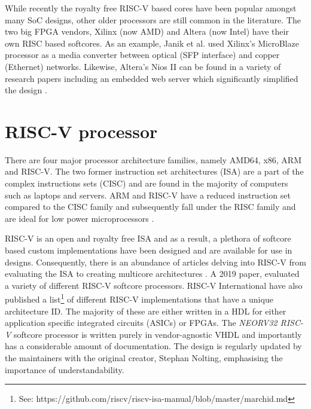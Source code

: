 While recently the royalty free RISC-V based cores have been popular amongst many SoC designs, other older processors are still common in the literature. The two big FPGA vendors, Xilinx (now AMD) and Altera (now Intel) have their own RISC based softcores. As an example, Janik et al. \cite{LwIPMicroblaze} used Xilinx's MicroBlaze processor as a media converter between optical (SFP interface) and copper (Ethernet) networks. Likewise, Altera's Nios II can be found in a variety of research papers including an embedded web server which significantly simplified the design \cite{NiosIIWebserver}. 

 







\section{RISC-V processor}
There are four major processor architecture families, namely AMD64, x86, ARM and RISC-V. The two former instruction set architectures (ISA) 
are a part of the complex instructions sets (CISC) and are found in the majority of computers such as laptops and servers. ARM and RISC-V have a reduced instruction set compared to the CISC family and subsequently fall under the RISC family and are ideal for low power microprocessors \cite{RV16Embedded}.

RISC-V is an open and royalty free ISA and as a result, a plethora of softcore based custom implementations have been designed and are available for use in designs\cite{CatalogRISCSoftcore}. 
Consequently, there is an abundance of articles delving into RISC-V from evaluating the ISA \cite{InvestigatingRiscv} to creating multicore architectures
\cite{RiscVMulticore}. A 2019 paper, \cite{CatalogRISCSoftcore} evaluated a variety of different RISC-V softcore processors. RISC-V International have 
also published a list\footnote[1]{See: https://github.com/riscv/riscv-isa-manual/blob/master/marchid.md} of different RISC-V implementations 
that have a unique architecture ID. The majority of these are either written in a HDL for either application specific integrated circuits (ASICs) or FPGAs.
The \textit{NEORV32 RISC-V} softcore processor is written purely in vendor-agnostic VHDL and importantly has a considerable amount of documentation. The design is regularly updated by the maintainers with the original creator, Stephan Nolting, emphasising the importance of understandability. 

